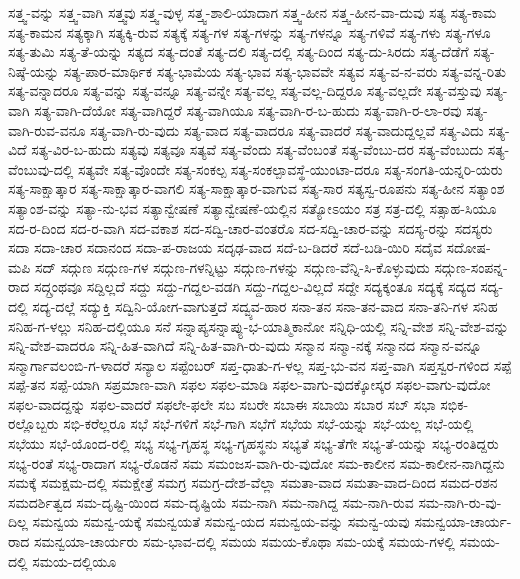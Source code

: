 {ಸತ್ತ್ವ-ವನ್ನು
ಸತ್ತ್ವ-ವಾಗಿ
ಸತ್ತ್ವವು
ಸತ್ತ್ವ-ವುಳ್ಳ
ಸತ್ತ್ವ-ಶಾಲಿ-ಯಾದಾಗ
ಸತ್ತ್ವ-ಹೀನ
ಸತ್ತ್ವ-ಹೀನ-ವಾ-ದುವು
ಸತ್ಯ
ಸತ್ಯ-ಕಾಮ
ಸತ್ಯ-ಕಾಮನ
ಸತ್ಯಕ್ಕಾಗಿ
ಸತ್ಯಕ್ಕಿ-ರುವ
ಸತ್ಯಕ್ಕೆ
ಸತ್ಯ-ಗಳ
ಸತ್ಯ-ಗಳನ್ನು
ಸತ್ಯ-ಗಳನ್ನೂ
ಸತ್ಯ-ಗಳಿವೆ
ಸತ್ಯ-ಗಳು
ಸತ್ಯ-ಗಳೂ
ಸತ್ಯ-ತುಮಿ
ಸತ್ಯ-ತೆ-ಯನ್ನು
ಸತ್ಯದ
ಸತ್ಯ-ದಂತೆ
ಸತ್ಯ-ದಲಿ
ಸತ್ಯ-ದಲ್ಲಿ
ಸತ್ಯ-ದಿಂದ
ಸತ್ಯ-ದು-ಸಿರದು
ಸತ್ಯ-ದೆಡೆಗೆ
ಸತ್ಯ-ನಿಷ್ಠೆ-ಯನ್ನು
ಸತ್ಯ-ಪಾರ-ಮಾರ್ಥಿಕ
ಸತ್ಯ-ಭಾಮೆಯ
ಸತ್ಯ-ಭಾವ
ಸತ್ಯ-ಭಾವವೇ
ಸತ್ಯವ
ಸತ್ಯ-ವ-ನ-ವರು
ಸತ್ಯ-ವನ್ನ-ರಿತು
ಸತ್ಯ-ವನ್ನಾದರೂ
ಸತ್ಯ-ವನ್ನು
ಸತ್ಯ-ವನ್ನೂ
ಸತ್ಯ-ವನ್ನೇ
ಸತ್ಯ-ವಲ್ಲ
ಸತ್ಯ-ವಲ್ಲ-ದಿದ್ದರೂ
ಸತ್ಯ-ವಲ್ಲದೇ
ಸತ್ಯ-ವಸ್ತುವು
ಸತ್ಯ-ವಾಗಿ
ಸತ್ಯ-ವಾಗಿ-ದೆಯೋ
ಸತ್ಯ-ವಾಗಿದ್ದರೆ
ಸತ್ಯ-ವಾಗಿಯೂ
ಸತ್ಯ-ವಾಗಿ-ರ-ಬ-ಹುದು
ಸತ್ಯ-ವಾಗಿ-ರ-ಲಾ-ರವು
ಸತ್ಯ-ವಾಗಿ-ರುವ-ವನೂ
ಸತ್ಯ-ವಾಗಿ-ರು-ವುದು
ಸತ್ಯ-ವಾದ
ಸತ್ಯ-ವಾದರೂ
ಸತ್ಯ-ವಾದರೆ
ಸತ್ಯ-ವಾದುದ್ದಲ್ಲವೆ
ಸತ್ಯ-ವಿದು
ಸತ್ಯ-ವಿದೆ
ಸತ್ಯ-ವಿರ-ಬ-ಹುದು
ಸತ್ಯವು
ಸತ್ಯವೂ
ಸತ್ಯವೆ
ಸತ್ಯ-ವೆಂದು
ಸತ್ಯ-ವೆಂಬಂತೆ
ಸತ್ಯ-ವೆಂಬು-ದರ
ಸತ್ಯ-ವೆಂಬುದು
ಸತ್ಯ-ವೆಂಬುವು-ದಲ್ಲಿ
ಸತ್ಯವೇ
ಸತ್ಯ-ವೊಂದೇ
ಸತ್ಯ-ಸಂಕಲ್ಪ
ಸತ್ಯ-ಸಂಕಲ್ಪಾವಸ್ಥೆ-ಯುಂಟಾ-ದರೂ
ಸತ್ಯ-ಸಂಗತಿ-ಯನ್ನರಿ-ಯರು
ಸತ್ಯ-ಸಾಕ್ಷಾತ್ಕಾರ
ಸತ್ಯ-ಸಾಕ್ಷಾತ್ಕಾರ-ವಾಗಲಿ
ಸತ್ಯ-ಸಾಕ್ಷಾತ್ಕಾರ-ವಾಗುವ
ಸತ್ಯ-ಸಾರ
ಸತ್ಯಸ್ವ-ರೂಪನು
ಸತ್ಯ-ಹೀನ
ಸತ್ಯಾಂಶ
ಸತ್ಯಾಂಶ-ವನ್ನು
ಸತ್ಯಾ-ನು-ಭವ
ಸತ್ಯಾನ್ವೇಷಣೆ
ಸತ್ಯಾನ್ವೇಷಣೆ-ಯಲ್ಲಿನ
ಸತ್ಯೋಽಯಂ
ಸತ್ರ
ಸತ್ರ-ದಲ್ಲಿ
ಸತ್ಸಾಹ-ಸಿಯೂ
ಸದ-ರ-ದಿಂದ
ಸದ-ರ-ವಾಗಿ
ಸದ-ವಕಾಶ
ಸದ-ಸದ್ವಿ-ಚಾರ-ವಂತರೊ
ಸದ-ಸದ್ವಿ-ಚಾರ-ವನ್ನು
ಸದಸ್ಯ-ರನ್ನು
ಸದಸ್ಯರು
ಸದಾ
ಸದಾ-ಚಾರ
ಸದಾನಂದ
ಸದಾ-ಪ-ರಾಜಯ
ಸದೃಢ-ವಾದ
ಸದೆ-ಬ-ಡಿದರೆ
ಸದೆ-ಬಡಿ-ಯಿರಿ
ಸದೈವ
ಸದೋಷ-ಮಪಿ
ಸದ್
ಸದ್ಗುಣ
ಸದ್ಗುಣ-ಗಳ
ಸದ್ಗುಣ-ಗಳನ್ನಿಟ್ಟು
ಸದ್ಗುಣ-ಗಳನ್ನು
ಸದ್ಗುಣ-ವೆನ್ನಿ-ಸಿ-ಕೊಳ್ಳುವುದು
ಸದ್ಗುಣ-ಸಂಪನ್ನ-ರಾದ
ಸದ್ಗ್ರಂಥವೂ
ಸದ್ದಿಲ್ಲದೆ
ಸದ್ದು
ಸದ್ದು-ಗದ್ದಲ-ವಡಗಿ
ಸದ್ದು-ಗದ್ದಲ-ವಿಲ್ಲದೆ
ಸದ್ದೇ
ಸದ್ಯಕ್ಕಂತೂ
ಸದ್ಯಕ್ಕೆ
ಸದ್ಯದ
ಸದ್ಯ-ದಲ್ಲಿ
ಸದ್ಯ-ದಲ್ಲೆ
ಸದ್ಯುಕ್ತಿ
ಸದ್ವಿನಿ-ಯೋಗ-ವಾಗುತ್ತದೆ
ಸದ್ವ್ಯವ-ಹಾರ
ಸನಾ-ತನ
ಸನಾ-ತನ-ವಾದ
ಸನಾ-ತನಿ-ಗಳ
ಸನಿಹ
ಸನಿಹ-ಗ-ಳಲ್ಲು
ಸನಿಹ-ದಲ್ಲಿಯೂ
ಸನೆ
ಸನ್ನಾಪ್ಯಸನ್ನಾಪ್ಯು-ಭ-ಯಾತ್ಮಿಕಾನೋ
ಸನ್ನಿಧಿ-ಯಲ್ಲಿ
ಸನ್ನಿ-ವೇಶ
ಸನ್ನಿ-ವೇಶ-ವನ್ನು
ಸನ್ನಿ-ವೇಶ-ವಾದರೂ
ಸನ್ನಿ-ಹಿತ-ವಾಗಿದೆ
ಸನ್ನಿ-ಹಿತ-ವಾಗಿ-ರು-ವುದು
ಸನ್ಮಾನ
ಸನ್ಮಾ-ನಕ್ಕೆ
ಸನ್ಮಾನದ
ಸನ್ಮಾನ-ವನ್ನೂ
ಸನ್ಮಾರ್ಗಾವಲಂಬಿ-ಗ-ಳಾದರೆ
ಸನ್ಯಾಲ
ಸಪ್ಟೆಂಬರ್
ಸಪ್ತ-ಧಾತು-ಗ-ಳಲ್ಲ
ಸಪ್ತ-ಭು-ವನ
ಸಪ್ತ-ವಾಗಿ
ಸಪ್ತಸ್ವರ-ಗಳಿಂದ
ಸಪ್ಪೆ
ಸಪ್ಪೆ-ತನ
ಸಪ್ಪೆ-ಯಾಗಿ
ಸಪ್ರಮಾಣ-ವಾಗಿ
ಸಫಲ
ಸಫಲ-ಮಾಡಿ
ಸಫಲ-ವಾಗು-ವುದಕ್ಕೋಸ್ಕರ
ಸಫಲ-ವಾಗು-ವುದೋ
ಸಫಲ-ವಾದದ್ದನ್ನು
ಸಫಲ-ವಾದರೆ
ಸಫಲೇ-ಫಲೇ
ಸಬ
ಸಬರೇ
ಸಬಾಈ
ಸಬಾಯಿ
ಸಬಾರ
ಸಬ್
ಸಭಾ
ಸಭಿಕ-ರಲ್ಲೊಬ್ಬರು
ಸಭಿ-ಕರೆಲ್ಲರೂ
ಸಭೆ
ಸಭೆ-ಗಳಿಗೆ
ಸಭೆ-ಗಾಗಿ
ಸಭೆಗೆ
ಸಭೆಯ
ಸಭೆ-ಯನ್ನು
ಸಭೆ-ಯಲ್ಲ
ಸಭೆ-ಯಲ್ಲಿ
ಸಭೆಯು
ಸಭೆ-ಯೊಂದ-ರಲ್ಲಿ
ಸಭ್ಯ
ಸಭ್ಯ-ಗೃಹಸ್ಥ
ಸಭ್ಯ-ಗೃಹಸ್ಥನು
ಸಭ್ಯತೆ
ಸಭ್ಯ-ತೆಗೇ
ಸಭ್ಯ-ತೆ-ಯನ್ನು
ಸಭ್ಯ-ರಂತಿದ್ದರು
ಸಭ್ಯ-ರಂತೆ
ಸಭ್ಯ-ರಾದಾಗ
ಸಭ್ಯ-ರೊಡನೆ
ಸಮ
ಸಮಂಜಸ-ವಾಗಿ-ರು-ವುದೋ
ಸಮ-ಕಾಲೀನ
ಸಮ-ಕಾಲೀನ-ನಾಗಿದ್ದನು
ಸಮಕ್ಕೆ
ಸಮಕ್ಷಮ-ದಲ್ಲಿ
ಸಮಕ್ಷೇತ್ರೆ
ಸಮಗ್ರ
ಸಮಗ್ರ-ದೇಶ-ವೆಲ್ಲಾ
ಸಮತಾ-ವಾದ
ಸಮತಾ-ವಾದ-ದಿಂದ
ಸಮದ-ರಶನ
ಸಮದರ್ಶಿತ್ವದ
ಸಮ-ದೃಷ್ಟಿ-ಯಿಂದ
ಸಮ-ದೃಷ್ಟಿಯೆ
ಸಮ-ನಾಗಿ
ಸಮ-ನಾಗಿದ್ದ
ಸಮ-ನಾಗಿ-ರುವ
ಸಮ-ನಾಗಿ-ರು-ವು-ದಿಲ್ಲ
ಸಮನ್ವಯ
ಸಮನ್ವ-ಯಕ್ಕೆ
ಸಮನ್ವಯತೆ
ಸಮನ್ವ-ಯದ
ಸಮನ್ವಯ-ವನ್ನು
ಸಮನ್ವ-ಯವು
ಸಮನ್ವಯಾ-ಚಾರ್ಯ-ರಾದ
ಸಮನ್ವಯಾ-ಚಾರ್ಯರು
ಸಮ-ಭಾವ-ದಲ್ಲಿ
ಸಮಯ
ಸಮಯ-ಕೊಥಾ
ಸಮ-ಯಕ್ಕೆ
ಸಮಯ-ಗಳಲ್ಲಿ
ಸಮಯ-ದಲ್ಲಿ
ಸಮಯ-ದಲ್ಲಿಯೂ
}
